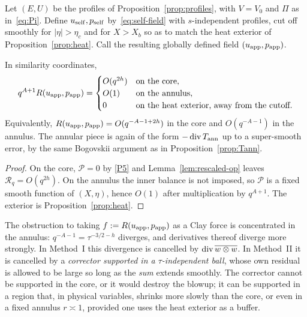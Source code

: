 \begin{construction}
\label{con:ss}
Let $(E,U)$ be the profiles of Proposition~\ref{prop:profiles}, with $V=V_0$ and $\Pi$ as in~\eqref{eq:Pi}. Define $u_{\mathrm{self}},p_{\mathrm{self}}$ by~\eqref{eq:self-field} with $s$-independent profiles, cut off smoothly for $|\eta|>\eta_c$ and for $X>X_b$ so as to match the heat exterior of Proposition~\ref{prop:heat}. Call the resulting globally defined field $(u_{\mathrm{app}},p_{\mathrm{app}})$.
\end{construction}

\begin{lemma}
\label{lem:app-residual}
In similarity coordinates,
\begin{equation}
\label{eq:app-res}
q^{A+1}R(u_{\mathrm{app}},p_{\mathrm{app}})
=
\begin{cases}
O(q^{2h}) & \text{on the core},\\
O(1) & \text{on the annulus},\\
0 & \text{on the heat exterior, away from the cutoff}.
\end{cases}
\end{equation}
Equivalently, $R(u_{\mathrm{app}},p_{\mathrm{app}})=O(q^{-A-1+2h})$ in the core and $O(q^{-A-1})$ in the annulus. The annular piece is again of the form $-\operatorname{div} T_{\mathrm{ann}}$ up to a super-smooth error, by the same {B}ogovskii argument as in Proposition~\ref{prop:Tann}.
\end{lemma}

\begin{proof}
On the core, $\mathcal P=0$ by \ref{P5} and Lemma~\ref{lem:rescaled-op} leaves $\mathcal R_q=O(q^{2h})$. On the annulus the inner balance is not imposed, so $\mathcal P$ is a fixed smooth function of $(X,\eta)$, hence $O(1)$ after multiplication by $q^{A+1}$. The exterior is Proposition~\ref{prop:heat}.
\end{proof}

The obstruction to taking $f:=R(u_{\mathrm{app}},p_{\mathrm{app}})$ as a {C}lay force is concentrated in the annulus: $q^{-A-1}=\tau^{-3/2-h}$ diverges, and derivatives thereof diverge more strongly. In Method~I this divergence is cancelled by $\operatorname{div}\overline{w\otimes w}$. In Method~II it is cancelled by a \emph{corrector supported in a $\tau$-independent ball}, whose own residual is allowed to be large so long as the \emph{sum} extends smoothly. The corrector cannot be supported in the core, or it would destroy the blowup; it can be supported in a region that, in physical variables, shrinks more slowly than the core, or even in a fixed annulus $r\asymp 1$, provided one uses the heat exterior as a buffer.

